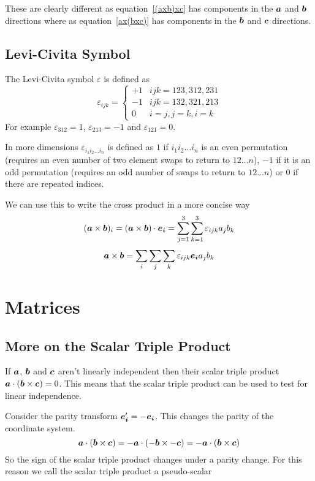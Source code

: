 \documentclass{article}
\begin{document}
    These are clearly different as equation~\ref{(axb)xc} has components in the \(\bm{a}\) and \(\bm{b}\) directions where as equation~\ref{ax(bxc)} has components in the \(\bm{b}\) and \(\bm{c}\) directions.

    \subsection{Levi-Civita Symbol}
    The Levi-Civita symbol \(\varepsilon\) is defined as
    \[
        \varepsilon_{ijk} = \left\{
        \begin{array}{cc}
            +1 & ijk = 123, 312, 231\\
            -1 & ijk = 132, 321, 213\\
            0  & i=j, j=k, i=k
        \end{array}
        \right.
    \]
    For example \(\varepsilon_{312}=1\), \(\varepsilon_{213}=-1\) and \(\varepsilon_{121}=0\).
    
    In more dimensions \(\varepsilon_{i_1i_2\dotso i_n}\) is defined as \(1\) if \(i_1i_2\dots i_n\) is an even permutation (requires an even number of two element swaps to return to \(12\dotso n\)), \(-1\) if it is an odd permutation (requires an odd number of swaps to return to \(12\dotso n\)) or 0 if there are repeated indices.
    
    We can use this to write the cross product in a more concise way
    \[(\bm{a}\times\bm{b})_i = (\bm{a}\times\bm{b})\cdot\bm{e_{i}}=\sum_{j=1}^{3}\sum_{k=1}^{3}\varepsilon_{ijk}a_jb_k\]
    \[\bm{a}\times\bm{b} = \sum_i\sum_j\sum_k\varepsilon_{ijk}\bm{e_{i}}a_jb_k\]
    
    \section{Matrices}
    
    \subsection{More on the Scalar Triple Product}
    If \(\bm{a}\), \(\bm{b}\) and \(\bm{c}\) aren't linearly independent then their scalar triple product \(\bm{a}\cdot(\bm{b}\times\bm{c}) = 0\). 
    This means that the scalar triple product can be used to test for linear independence.
    
    Consider the parity transform \(\bm{e_{i}}' = -\bm{e_{i}}\). This changes the parity of the coordinate system.
    \[\bm{a}\cdot(\bm{b}\times\bm{c}) = -\bm{a}\cdot(-\bm{b}\times-\bm{c}) = -\bm{a}\cdot(\bm{b}\times\bm{c})\]
    So the sign of the scalar triple product changes under a parity change. For this reason we call the scalar triple product a pseudo-scalar
    
\end{document}
